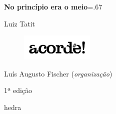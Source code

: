 




\begingroup\thispagestyle{empty}\vspace*{-.01\textheight}\parindent=0pt 
              \formular
              \Huge 
              \textbf{No princípio era o meio}\baselineskip=.67\baselineskip 

              \smaller[3]\textit{}
              \vspace{15mm}
              
              \LARGE
              Luiz Tatit
              
              \vspace{5cm}

              \begin{figure}
              \vspace{5.45cm}
              \includegraphics[width=3.5cm]{./logoacorde.png}
              \end{figure}

              \newfontfamily{}
              {\selectfont\minion\small Luís Augusto Fischer (\textit{organização})}
              
              {\selectfont\minion\footnotesize
              1ª edição}
                    
              \vfill

              \newfontfamily{}
              {\fontsize{30}{40}\selectfont \timesnewroman hedra}
              
